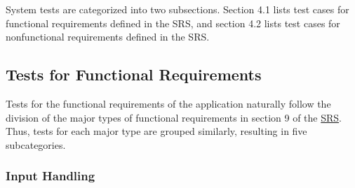 \documentclass[12pt, titlepage]{article}
\begin{document}
System tests are categorized into two subsections. Section 4.1 lists test cases for functional requirements defined in 
the SRS, and section 4.2 lists test cases for nonfunctional requirements defined in the SRS. 

\subsection{Tests for Functional Requirements}
Tests for the functional requirements of the application naturally follow the division of the major types of functional requirements
in section 9 of the \href{https://github.com/emilyperica/ScoreGen/blob/main/docs/SRS-Volere/SRS.pdf}{SRS}. Thus, tests for each major 
type are grouped similarly, resulting in five subcategories.

  \subsubsection{Input Handling}
  \label{FR-AR}
\end{document}
